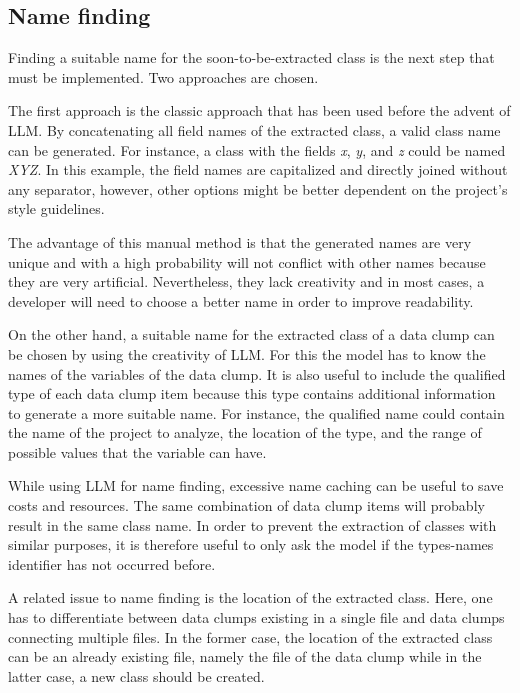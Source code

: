\subsection{Name finding}
Finding a suitable name for the soon-to-be-extracted class is the next step  that must be implemented. Two approaches are chosen.

The first approach is the classic approach that has been used before the advent of \acs{LLM}. By concatenating all field names of the extracted class, a valid class name can be generated. For instance, a class with the fields \textit{x}, \textit{y}, and \textit{z} could be named \textit{XYZ}. In this example, the field names are capitalized and directly joined without any separator, however, other options might be better dependent on the project's style guidelines. 

The advantage of this manual method is that the generated names are very unique and with a high probability will not conflict with other names because they are very artificial. Nevertheless, they lack creativity and in most cases, a developer will need to choose a better name in order to improve readability. 


On the other hand, a suitable name for the extracted class of a data clump can be chosen by using the creativity of \acs{LLM}.  For this the model has to know the names of the variables of the data clump. It is also useful to include the qualified type of each data clump item because this type contains additional information to generate a more suitable name. For instance, the qualified name could contain the name of the project to analyze, the location of the type,     and the range of possible values that the variable can have.

While using \acs{LLM} for name finding, excessive name caching can be useful to save costs and resources. The same combination of data clump items will probably result in the same class name. In order to prevent the extraction of classes with similar purposes, it is therefore useful to only ask the model if the types-names identifier has not occurred before. 

A related issue to name finding is the location of the extracted class. Here, one has to differentiate  between data clumps existing in a single file and data clumps connecting multiple files. In the former case, the location of the extracted class can be an already existing file, namely the file of the data clump  while in the latter case, a new class should be created.

